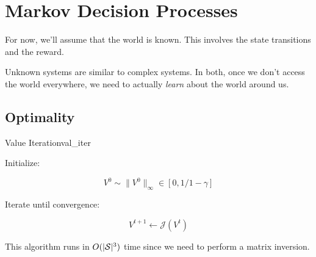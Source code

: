 \documentclass[../main/main]{subfiles}
\begin{document}
    
\chapter{Markov Decision Processes}


For now, we'll assume that the world is known. This involves the state transitions and the reward.

Unknown systems are similar to complex systems. In both, once we don't access the world everywhere, we need to actually \emph{learn} about the world around us.



\section{Optimality}


\begin{theorem}{Value Iteration}{val_iter}

Initialize:

\[
    V^0 \sim \|V^0\|_\infty \in [0, 1/1-\gamma]
\]

Iterate until convergence:

\[
    V^{t+1} \gets \mathcal{J}(V^t)
\]


This algorithm runs in $O(|\mathcal{S}|^3)$ time since we need to perform a matrix
inversion.

\end{theorem}
\end{document}
